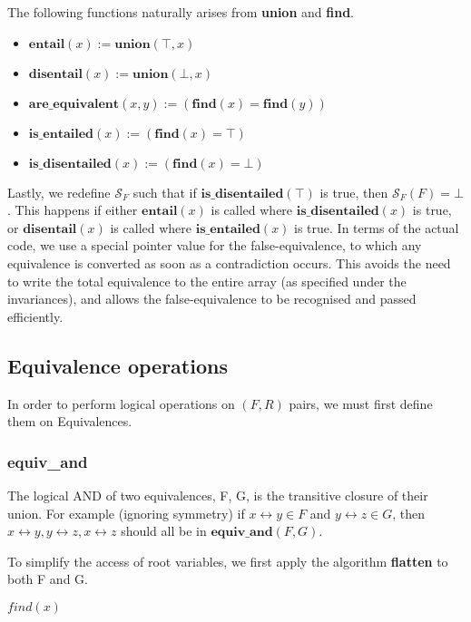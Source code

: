 \documentclass[11pt,table]{article}
\newcounter{r}
\newcommand{\bimv}[2]{#1\leftrightarrow{#2}}
\newcommand{\semF}[1]{\mathcal{S}_F(#1)}
\newcommand{\func}[2]{\mathbf{#1}(#2)}
\begin{document}
The following functions naturally arises from \textbf{union} and \textbf{find}.
\begin{itemize}
	\item $ \func{entail}{x} := \func{union}{\top,x} $
	\item $ \func{disentail}{x} := \func{union}{\bot,x} $
	\item $ \func{are\_equivalent}{x,y} := (\func{find}{x}=\func{find}{y}) $
	\item $ \func{is\_entailed}{x} := (\func{find}{x}=\top) $
	\item $ \func{is\_disentailed}{x} := (\func{find}{x}=\bot) $
\end{itemize}

Lastly, we redefine $ \mathcal{S}_F $ such that if $ \func{is\_disentailed}{\top} $ is true, then $ \semF{F} = \bot $. This happens if either $ \func{entail}{x} $ is called where $ \func{is\_disentailed}{x} $ is true, or $ \func{disentail}{x} $ is called where $  \func{is\_entailed}{x} $ is true. In terms of the actual code, we use a special pointer value for the false-equivalence, to which any equivalence is converted as soon as a contradiction occurs. This avoids the need to write the total equivalence to the entire array (as specified under the invariances), and allows the false-equivalence to be recognised and passed efficiently.

\subsection{Equivalence operations}

In order to perform logical operations on $ (F,R) $ pairs, we must first define them on Equivalences.

\subsubsection{equiv\_and}
The logical AND of two equivalences, F, G, is the transitive closure of their union.  For example (ignoring symmetry) if $ \bimv{x}{y} \in F $ and $ \bimv{y}{z} \in G $, then $ \bimv{x}{y}, \bimv{y}{z}, \bimv{x}{z} $ should all be in $ \func{equiv\_and}{F,G} $.

To simplify the access of root variables, we first apply the algorithm \textbf{flatten} to both F and G.

\begin{algorithm}
	\begin{algorithmic}[1]
		
		\State $ find(x) $
		\EndFor
		
		\EndFunction
	\end{algorithmic}
\end{algorithm}
\end{document}
